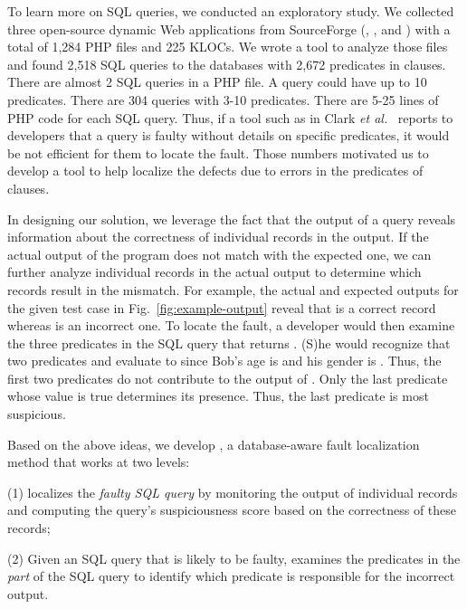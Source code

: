 To learn more on SQL queries, we conducted an exploratory study. We
collected three open-source dynamic Web applications from SourceForge
(, , and ) with a
total of 1,284 PHP files and 225 KLOCs. We wrote a tool to analyze
those files and found 2,518 SQL queries to the databases with 2,672
predicates in  clauses. There are almost 2 SQL queries in
a PHP file. A query could have up to 10 predicates. There are 304
queries with 3-10 predicates. There are 5-25 lines of PHP code for
each SQL query. Thus, if a tool such as in Clark {\em et
al.}~\cite{ga-ase11} reports to developers that a query is faulty
without details on specific predicates, it would be not efficient for
them to locate the fault. Those numbers motivated us to develop a tool
to help localize the defects due to errors in the predicates of
 clauses.

In designing our solution, we leverage the fact that the output of a
query reveals information about the correctness of individual records
in the output. If the actual output of the program does not match with
the expected one, we can further analyze individual records in the
actual output to determine which records result in the mismatch. For
example, the actual and expected outputs for the given test case in
Fig.~\ref{fig:example-output} reveal that  is a correct
record whereas  is an incorrect one. To locate the fault,
a developer would then examine the three predicates in the SQL query
that returns . (S)he would recognize that two
predicates  and  evaluate to
 since Bob's age is  and his gender is
. Thus, the first two predicates do not contribute to the
output of . Only the last predicate whose value is true
determines its presence. Thus, the last predicate is most suspicious.



Based on the above ideas, we develop {\tool}, a database-aware fault
localization method that works at two levels:

(1) \tool{} localizes the {\em faulty SQL query} by monitoring the
output of individual records and computing the query's suspiciousness
score based on the correctness of these records;

(2) Given an SQL query that is likely to be faulty, \tool{} examines
the predicates in the {\em {} part} of the SQL query to
identify which predicate is responsible for the incorrect output.

